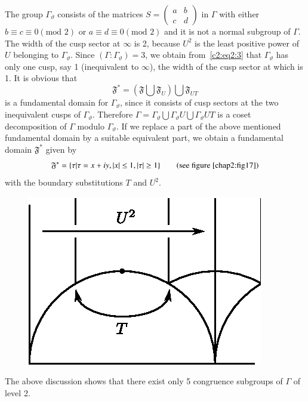 The group $\Gamma_{\vartheta}$ consists of the matrices
$S=\left(\begin{smallmatrix}a&b\\c&d \end{smallmatrix}\right)$ in
$\Gamma$ with either $b\equiv c \equiv 0(\text{mod } 2)$ \pageoriginale or
$a\equiv d \equiv 0(\text{mod } 2)$ and it is not a normal subgroup of
$\Gamma$. The width of the cusp sector at $\infty$ is 2, because $U^2$
is the least positive power of $U$ belonging to
$\Gamma_{\vartheta}$. Since $(\Gamma:\Gamma_{\vartheta})=3$, we obtain
from~\eqref{c2:eq2:3} that $\Gamma_{\vartheta}$ has only one cusp, say 1
(inequivalent to $\infty$), the width of the cusp sector at which is
1. It is obvious that 
$$
\mathfrak{F}^{\ast} =(\mathfrak{F} \bigcup \mathfrak{F}_U) \bigcup
\mathfrak{F}_{UT} 
$$
is a fundamental domain for $\Gamma_{\vartheta}$, since it consists of
cusp sectors at the two inequivalent cusps of
$\Gamma_{\vartheta}$. Therefore $\Gamma=\Gamma_{\vartheta}\bigcup
\Gamma_{\vartheta} U \bigcup \Gamma_{\vartheta} UT$ is a coset
decomposition of $\Gamma$ modulo $\Gamma_{\vartheta}$. If we replace a
part of the above mentioned fundamental domain by a suitable equivalent
part, we obtain a fundamental domain $\mathfrak{F}^{\ast}$ given by 
$$
\mathfrak{F}^{\ast} = \{\tau |\tau = x+ iy, |x| \leq 1, |\tau| \geq
1\} \qquad (\text{see figure~\ref{chap2:fig17}})
$$
with the boundary substitutions $T$ and $U^2$.

\begin{figure}[H]
\centering
\includegraphics{vol29-fig/fig29-17.eps}
\smallskip
\caption{}
\label{chap2:fig17}
\end{figure}

The \pageoriginale above discussion shows that there exist only 5
congruence subgroups of $\Gamma$ of level 2. 

